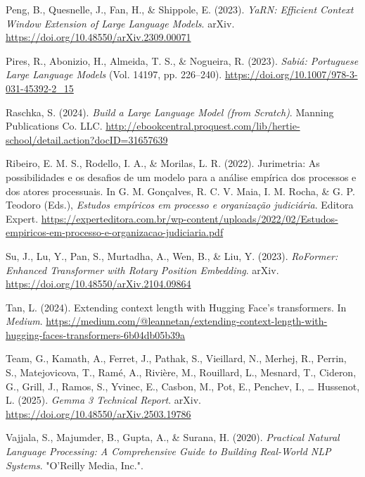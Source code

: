 \documentclass[
  12pt,
]{article}
\newlength{\cslhangindent}
\newenvironment{CSLReferences}[2] %
 {\begin{list}{}{%
  \setlength{\itemindent}{0pt}
  \setlength{\leftmargin}{0pt}
  \setlength{\parsep}{0pt}
  \ifodd #1
   \setlength{\leftmargin}{\cslhangindent}
   \setlength{\itemindent}{-1\cslhangindent}
  \fi
  \setlength{\itemsep}{#2\baselineskip}}}
 {\end{list}}
\begin{document}
\begin{CSLReferences}{1}{0}
Peng, B., Quesnelle, J., Fan, H., \& Shippole, E. (2023). \emph{{YaRN}:
{Efficient} {Context} {Window} {Extension} of {Large} {Language}
{Models}}. arXiv. \url{https://doi.org/10.48550/arXiv.2309.00071}

Pires, R., Abonizio, H., Almeida, T. S., \& Nogueira, R. (2023).
\emph{Sabiá: {Portuguese} {Large} {Language} {Models}} (Vol. 14197, pp.
226--240). \url{https://doi.org/10.1007/978-3-031-45392-2_15}

Raschka, S. (2024). \emph{Build a {Large} {Language} {Model} (from
{Scratch})}. Manning Publications Co. LLC.
\url{http://ebookcentral.proquest.com/lib/hertie-school/detail.action?docID=31657639}

Ribeiro, E. M. S., Rodello, I. A., \& Morilas, L. R. (2022). Jurimetria:
As possibilidades e os desafios de um modelo para a análise empírica dos
processos e dos atores processuais. In G. M. Gonçalves, R. C. V. Maia,
I. M. Rocha, \& G. P. Teodoro (Eds.), \emph{Estudos empíricos em
processo e organização judiciária}. Editora Expert.
\url{https://experteditora.com.br/wp-content/uploads/2022/02/Estudos-empiricos-em-processo-e-organizacao-judiciaria.pdf}

Su, J., Lu, Y., Pan, S., Murtadha, A., Wen, B., \& Liu, Y. (2023).
\emph{{RoFormer}: {Enhanced} {Transformer} with {Rotary} {Position}
{Embedding}}. arXiv. \url{https://doi.org/10.48550/arXiv.2104.09864}

Tan, L. (2024). Extending context length with {Hugging} {Face}'s
transformers. In \emph{Medium}.
\url{https://medium.com/@leannetan/extending-context-length-with-hugging-faces-transformers-6b04db05b39a}

Team, G., Kamath, A., Ferret, J., Pathak, S., Vieillard, N., Merhej, R.,
Perrin, S., Matejovicova, T., Ramé, A., Rivière, M., Rouillard, L.,
Mesnard, T., Cideron, G., Grill, J., Ramos, S., Yvinec, E., Casbon, M.,
Pot, E., Penchev, I., \ldots{} Hussenot, L. (2025). \emph{Gemma 3
{Technical} {Report}}. arXiv.
\url{https://doi.org/10.48550/arXiv.2503.19786}

Vajjala, S., Majumder, B., Gupta, A., \& Surana, H. (2020).
\emph{Practical {Natural} {Language} {Processing}: {A} {Comprehensive}
{Guide} to {Building} {Real}-{World} {NLP} {Systems}}. "O'Reilly Media,
Inc.".


\end{CSLReferences}
\end{document}
